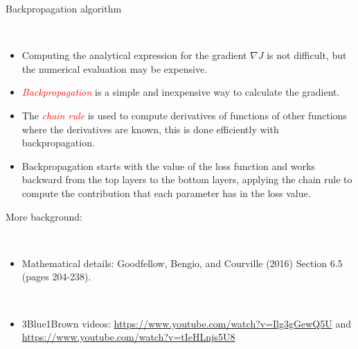 \documentclass[10pt,ignorenonframetext,]{beamer}
\providecommand{\tightlist}{%
  \setlength{\itemsep}{0pt}\setlength{\parskip}{0pt}}
\begin{document}
\begin{frame}

\begin{block}{Backpropagation algorithm}

\(~\)

\begin{itemize}
\tightlist
\item
  Computing the analytical expression for the gradient \(\nabla J\) is
  not difficult, but the numerical evaluation may be expensive.
\end{itemize}

\vspace{2mm}

\begin{itemize}
\tightlist
\item
  \emph{\textcolor{red}{Backpropagation}} is a simple and inexpensive
  way to calculate the gradient.
\end{itemize}

\vspace{2mm}

\begin{itemize}
\tightlist
\item
  The \emph{\textcolor{red}{chain rule}} is used to compute derivatives
  of functions of other functions where the derivatives are known, this
  is done efficiently with backpropagation.
\end{itemize}

\vspace{2mm}

\begin{itemize}
\tightlist
\item
  Backpropagation starts with the value of the loss function and works
  backward from the top layers to the bottom layers, applying the chain
  rule to compute the contribution that each parameter has in the loss
  value.
\end{itemize}

\end{block}

\end{frame}

\begin{frame}

More background:

\(~\)

\begin{itemize}
\tightlist
\item
  Mathematical details: Goodfellow, Bengio, and Courville (2016) Section
  6.5 (pages 204-238).
\end{itemize}

\(~\)

\begin{itemize}
\tightlist
\item
  3Blue1Brown videos: \url{https://www.youtube.com/watch?v=Ilg3gGewQ5U}
  and \url{https://www.youtube.com/watch?v=tIeHLnjs5U8}
\end{itemize}

\end{frame}
\end{document}
